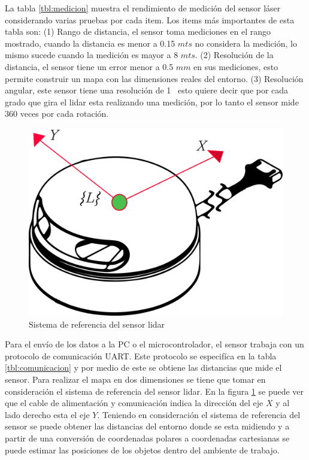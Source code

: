 La tabla \ref{tbl:medicion} muestra el rendimiento de medici\'on del 
sensor l\'aser \cite{Slamtec} considerando varias pruebas por cada item. Los items más 
importantes de esta tabla son: (1) Rango de distancia, el sensor toma mediciones en el
rango mostrado, cuando la distancia es menor a 0.15 $mts$ no considera la medición, lo 
mismo sucede cuando la medición es mayor a 8 $mts$. (2) Resolución de la distancia, el 
sensor tiene un error menor a 0.5 $mm$ en sus mediciones, esto permite construir un mapa 
con las dimensiones reales del entorno. (3) Resolución angular, este sensor tiene una 
resolución de 1\grad~ esto quiere decir que por cada grado que gira el lidar esta 
realizando una medición, por lo tanto el sensor mide 360 veces por cada rotación.

\begin{figure}
	\centering \footnotesize
	\includegraphics[width=0.40\linewidth]{images/frame_laser.png}
	\captionsetup{font=footnotesize}
	\caption{Sistema de referencia del sensor lidar}
	\label{fig:FrameLidar}
\end{figure}

Para el envío de los datos a la PC o el microcontrolador, el sensor trabaja con un protocolo
de comunicación UART. Este protocolo se especifíca en la tabla \ref{tbl:comunicacion} y 
por medio de este se obtiene las distancias que mide el sensor. Para realizar el mapa en 
dos dimensiones se tiene que tomar en consideración el sistema de referencia del sensor 
lidar. En la figura \ref{fig:FrameLidar} se puede ver que el cable de alimentación y comunicación 
indica la dirección del eje $X$ y al lado derecho esta el eje $Y$. Teniendo en consideración 
el sistema de referencia del sensor se puede obtener las distancias del entorno donde se esta 
midiendo y a partir de una conversión de coordenadas polares a coordenadas cartesianas se puede 
estimar las posiciones de los objetos dentro del ambiente de trabajo.

